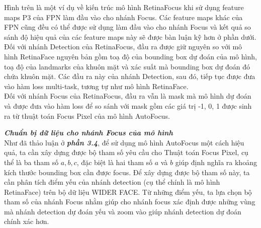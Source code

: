 {    \noindent
    Hình trên là một ví dụ về kiến trúc mô hình RetinaFocus khi sử dụng feature maps P3 của FPN làm đầu vào cho nhánh Focus.
    Các feature maps khác của FPN cũng đều có thể được sử dụng làm đầu vào cho nhánh Focus và kết quả so sánh độ hiệu quả của các feature maps này sẽ được bàn luận kỹ hơn ở phần dưới. \\
    Đối với nhánh Detection của RetinaFocus, đầu ra được giữ nguyên so với mô hình RetinaFace nguyên bản gồm toạ độ của bounding box dự đoán của mô hình, toạ độ của landmarks của khuôn mặt và xác suất mà bounding box dự đoán đó chứa khuôn mặt.
    Các đầu ra này của nhánh Detection, sau đó, tiếp tục được đưa vào hàm loss multi-task, tương tự như mô hình RetinaFace. \\
    Đối với nhánh Focus của RetinaFocus, đầu ra vẫn là mask mà mô hình dự đoán và được đưa vào hàm loss để so sánh với mask gồm các giá trị -1, 0, 1 được sinh ra từ thuật toán Focus Pixel của mô hình AutoFocus.

    \noindent
    \textbf{\textit{Chuẩn bị dữ liệu cho nhánh Focus của mô hình}} \\
    Như đã thảo luận ở \textbf{\textit{phần 3.4}}, để sử dụng mô hình AutoFocus một cách hiệu quả, ta cần xây dựng được bộ tham số yêu cầu cho Thuật toán Focus Pixel, cụ thể là ba tham số $a, b, c$, đặc biệt là hai tham số $a$ và $b$ giúp định nghĩa ra khoảng kích thước bounding box cần được focus.
    Để xây dựng được bộ tham số này, ta cần phân tích điểm yếu của nhánh detection (cụ thể chính là mô hình RetinaFace) trên bộ dữ liệu WIDER FACE.
    Từ những điểm yếu, ta lựa chọn bộ tham số của nhánh Focus nhằm giúp cho nhánh focus xác định được những vùng mà nhánh detection dự đoán yếu và zoom vào giúp nhánh detection dự đoán chính xác hơn.

}
